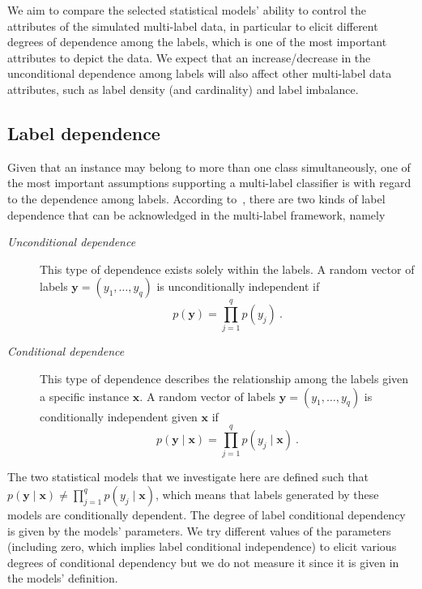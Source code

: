 \documentclass[review]{elsarticle}
\begin{document}
	We aim to compare the selected statistical models' ability to control the attributes of the simulated multi-label data, in particular to elicit different degrees of dependence among the labels, which is one of the most important attributes to depict the data. We expect that an increase/decrease in the unconditional dependence among labels will also affect other multi-label data attributes, such as label density (and cardinality) and label imbalance.
	
	\subsection{Label dependence}
	
	Given that an instance may belong to more than one class simultaneously, one of the most important assumptions supporting a multi-label classifier is with regard to the dependence among labels. According to~\citet{EG1}, there are two kinds of label dependence that can be acknowledged in the multi-label framework, namely
	\begin{description}
		\item[\it Unconditional dependence] This type of dependence exists solely within the labels. A random vector of labels $\mathbf{y} = \left(y_{1},\ldots,y_{q} \right)$ is unconditionally independent if
		\begin{equation} \label{UDEP}
		p(\mathbf{y}) = \prod^{q}_{j=1}{p(y_{j})}\ .
		\end{equation}
		\item[\it Conditional dependence] This type of dependence describes the relationship among the labels given a specific instance $\mathbf{x}$. A random vector of labels $\mathbf{y} = \left(y_{1},\ldots,y_{q} \right)$ is conditionally independent given $\mathbf{x}$ if
		\begin{equation} \label{CDEP}
		p(\mathbf{y}\mid\mathbf{x}) = \prod^{q}_{j=1}{p(y_{j}\mid\mathbf{x})}\ .
		\end{equation}
	\end{description}
	
	The two statistical models that we investigate here are defined such that $p(\mathbf{y}\mid\mathbf{x}) \neq \prod^{q}_{j=1}{p(y_{j}\mid\mathbf{x})}$, which means that labels generated by these models are conditionally dependent. The degree of label conditional dependency is given by the models' parameters. We try different values of the parameters (including zero, which implies label conditional independence) to elicit various degrees of conditional dependency but we do not measure it since it is given in the models' definition.
	
\end{document}
